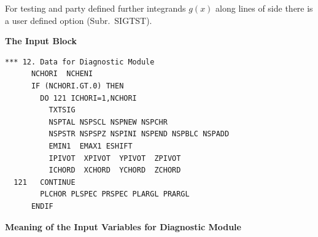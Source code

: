 For testing and  party defined further integrands $g(x)$ along
lines of side there is a user defined option (Subr.\ SIGTST).

\medskip

\textbf{The Input Block} 

\begin{lstlisting}
*** 12. Data for Diagnostic Module
      NCHORI  NCHENI
      IF (NCHORI.GT.0) THEN
        DO 121 ICHORI=1,NCHORI
          TXTSIG
          NSPTAL NSPSCL NSPNEW NSPCHR
          NSPSTR NSPSPZ NSPINI NSPEND NSPBLC NSPADD
          EMIN1  EMAX1 ESHIFT
          IPIVOT  XPIVOT  YPIVOT  ZPIVOT
          ICHORD  XCHORD  YCHORD  ZCHORD
  121   CONTINUE
        PLCHOR PLSPEC PRSPEC PLARGL PRARGL
      ENDIF
\end{lstlisting} 

\medskip 

\textbf{Meaning of the Input Variables for Diagnostic Module}

\medskip 

